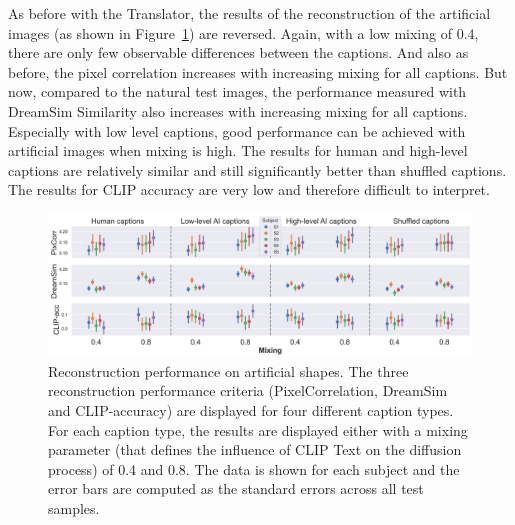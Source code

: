 As before with the Translator, the results of the reconstruction of the artificial images (as shown in Figure~\ref{fig:aicap_reconstruction_art_both_mixings}) are reversed. Again, with a low mixing of 0.4, there are only few observable differences between the captions. And also as before, the pixel correlation increases with increasing mixing for all captions. But now, compared to the natural test images, the performance measured with DreamSim Similarity also increases with increasing mixing for all captions. Especially with low level captions, good performance can be achieved with artificial images when mixing is high. The results for human and high-level captions are relatively similar and still significantly better than shuffled captions. The results for CLIP accuracy are very low and therefore difficult to interpret. 

\begin{figure}[ht]
    \centering
    \includegraphics[width=1\textwidth]{plots/aicap_reconstruction_art_both_mixings.png}
    \caption[Experiment 2: Reconstruction performance on artificial shapes]{Reconstruction performance on artificial shapes. The three reconstruction performance criteria (PixelCorrelation, DreamSim and CLIP-accuracy) are displayed for four different caption types. For each caption type, the results are displayed either with a mixing parameter (that defines the influence of CLIP Text on the diffusion process) of 0.4 and 0.8. The data is shown for each subject and the error bars are computed as the standard errors across all test samples.}\label{fig:aicap_reconstruction_art_both_mixings}
\end{figure}


